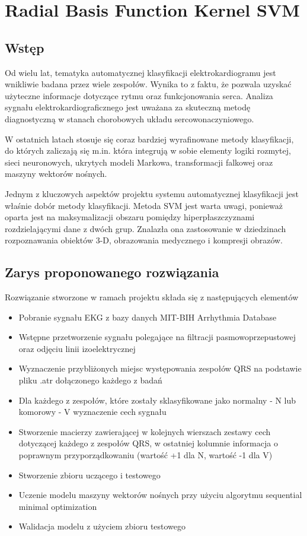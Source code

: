 \documentclass[[10pt,a4paper]{article}
\begin{document}
\newpage
\section {Radial Basis Function Kernel SVM}
\subsection {Wstęp}
Od wielu lat, tematyka automatycznej klasyfikacji elektrokardiogramu jest wnikliwie badana przez wiele zespołów. Wynika to z faktu, że pozwala uzyskać użyteczne informacje dotyczące rytmu oraz funkcjonowania serca. Analiza sygnału elektrokardiograficznego jest uważana za skuteczną metodę diagnostyczną w stanach chorobowych układu sercowonaczyniowego. 

W ostatnich latach stosuje się coraz bardziej wyrafinowane metody klasyfikacji, do których zaliczają się m.in. która integrują w sobie elementy logiki rozmytej, sieci neuronowych, ukrytych modeli Markowa, transformacji falkowej oraz maszyny wektorów nośnych.

Jednym z kluczowych aspektów projektu systemu automatycznej klasyfikacji jest właśnie dobór metody klasyfikacji. Metoda SVM jest warta uwagi, ponieważ oparta jest na maksymalizacji obszaru pomiędzy hiperpłaszczyznami rozdzielającymi dane z dwóch grup. Znalazła ona zastosowanie w dziedzinach rozpoznawania obiektów 3-D, obrazowania medycznego i kompresji obrazów. \cite{melgani}

\subsection{Zarys proponowanego rozwiązania}

Rozwiązanie stworzone w ramach projektu składa się z następujących elementów

\begin{itemize}
	\item{Pobranie sygnału EKG z bazy danych MIT-BIH Arrhythmia Database}
	\item{Wstępne przetworzenie sygnału polegające na filtracji pasmowoprzepustowej oraz odjęciu linii izoelektrycznej}
	\item{Wyznaczenie przybliżonych miejsc występowania zespołów QRS na podstawie pliku .atr dołączonego każdego z badań}
	\item{Dla każdego z zespołów, które zostały sklasyfikowane jako normalny - N lub komorowy - V wyznaczenie cech sygnału}
	\item{Stworzenie macierzy zawierającej w kolejnych wierszach zestawy cech dotyczącej każdego z zespołów QRS, w ostatniej kolumnie informacja o poprawnym przyporządkowaniu (wartość +1 dla N, wartość -1 dla V)}
	\item{Stworzenie zbioru uczącego i testowego}
	\item{Uczenie modelu maszyny wektorów nośnych przy użyciu algorytmu sequential minimal optimization}
	\item{Walidacja modelu z użyciem zbioru testowego}
\end{itemize}
\end{document}

